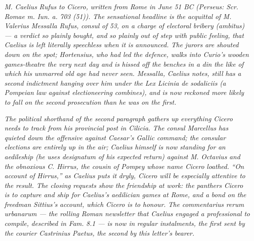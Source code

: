 
\textit{M. Caelius Rufus to Cicero, written from Rome in June
51 BC (Perseus: \textit{Scr. Romae m. Iun. a. 703 (51)}). The
sensational headline is the acquittal of M. Valerius Messalla
Rufus, consul of 53, on a charge of electoral bribery
(\textit{ambitus}) --- a verdict so plainly bought, and so
plainly out of step with public feeling, that Caelius is left
literally speechless when it is announced. The jurors are
shouted down on the spot; Hortensius, who had led the
defence, walks into Curio's wooden games-theatre the very
next day and is hissed off the benches in a din the like of
which his unmarred old age had never seen. Messalla, Caelius
notes, still has a second indictment hanging over him under
the Lex Licinia de sodaliciis (a Pompeian law against
electioneering combines), and is now reckoned more likely to
fall on the second prosecution than he was on the first.}

\textit{The political shorthand of the second paragraph
gathers up everything Cicero needs to track from his
provincial post in Cilicia. The consul Marcellus has
quieted down the offensive against Caesar's Gallic command;
the consular elections are entirely up in the air; Caelius
himself is now standing for an aedileship (he uses
\textit{designatum} of his expected return) against M.
Octavius and the obnoxious C. Hirrus, the cousin of Pompey
whose name Cicero loathed. ``On account of Hirrus,'' as
Caelius puts it dryly, Cicero will be especially attentive
to the result. The closing requests show the friendship at
work: the panthers Cicero is to capture and ship for
Caelius's aedilician games at Rome, and a bond on the
freedman Sittius's account, which Cicero is to honour. The
\textit{commentarius rerum urbanarum} --- the rolling Roman
newsletter that Caelius engaged a professional to compile,
described in \textit{Fam.} 8.1 --- is now in regular instalments,
the first sent by the courier Castrinius Paetus, the second
by this letter's bearer.}
